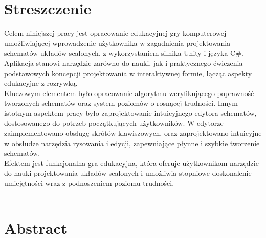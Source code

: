 \section*{Streszczenie}
\label{sec:streszczenie}
\thispagestyle{plain}
Celem niniejszej pracy jest opracowanie edukacyjnej gry komputerowej umożliwiającej wprowadzenie użytkownika
w zagadnienia projektowania schematów układów scalonych,
z wykorzystaniem silnika Unity i języka C\#.
Aplikacja stanowi narzędzie zarówno do nauki,
jak i praktycznego ćwiczenia podstawowych koncepcji projektowania w interaktywnej formie,
łącząc aspekty edukacyjne z rozrywką.\\
\indent %
Kluczowym elementem było opracowanie algorytmu weryfikującego
poprawność tworzonych schematów oraz system poziomów o rosnącej trudności.
Innym istotnym aspektem pracy było zaprojektowanie intuicyjnego edytora schema\-tów,
dostosowanego do potrzeb początkujących użytkowników.
W edytorze zaimplementowano obsługę skrótów klawiszowych, oraz zaprojektowano intuicyjne w obsłudze narzę\-dzia rysowania i edycji,
zapewniające płynne i szybkie tworzenie schematów.\\
\indent Efektem jest funkcjonalna gra edukacyjna,
która oferuje użytkownikom narzę\-dzie do nauki projektowania układów scalonych
i umożliwia stopniowe doskonalenie umiejętności wraz z podnoszeniem poziomu trudności.\\
\\


\section*{Abstract}
\label{sec:abstract}

